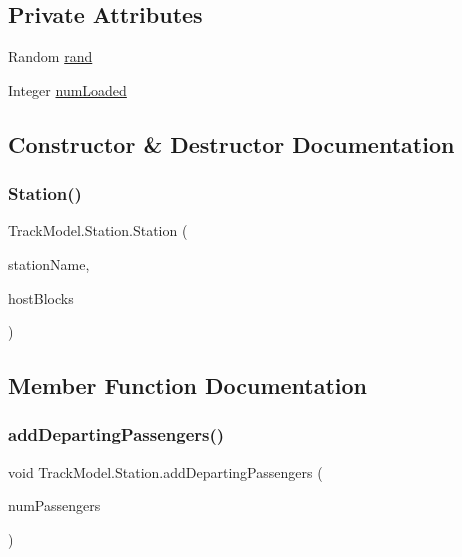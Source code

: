 \subsection*{Private Attributes}
\begin{DoxyCompactItemize}
\item 
Random \hyperlink{classTrackModel_1_1Station_a2876f95e84690acf90adc1a8714806ed}{rand}
\item 
Integer \hyperlink{classTrackModel_1_1Station_a39b4f364ac4ed45ed0607677245e396d}{num\+Loaded}
\end{DoxyCompactItemize}


\subsection{Constructor \& Destructor Documentation}
\mbox{\label{classTrackModel_1_1Station_a7eed6cecf5fb632c26a6064494b87ef9}} 
\subsubsection{\texorpdfstring{Station()}{Station()}}
{\footnotesize\ttfamily Track\+Model.\+Station.\+Station (\begin{DoxyParamCaption}\item[{String}]{station\+Name,  }\item[{Array\+List$<$ \hyperlink{classTrackModel_1_1Block}{Block} $>$}]{host\+Blocks }\end{DoxyParamCaption})}



\subsection{Member Function Documentation}
\mbox{\label{classTrackModel_1_1Station_a25a87034f554af5c03c420d89e63d3e3}} 
\subsubsection{\texorpdfstring{add\+Departing\+Passengers()}{addDepartingPassengers()}}
{\footnotesize\ttfamily void Track\+Model.\+Station.\+add\+Departing\+Passengers (\begin{DoxyParamCaption}\item[{Integer}]{num\+Passengers }\end{DoxyParamCaption})}



